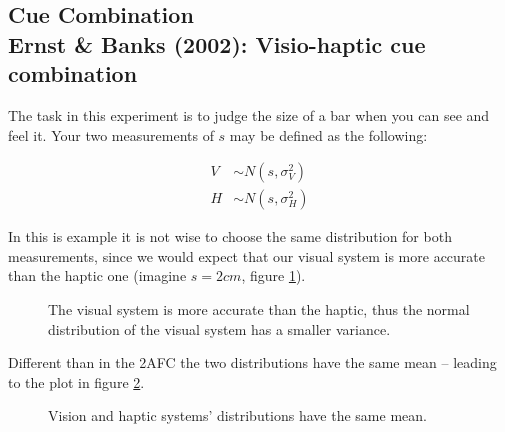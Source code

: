 \documentclass[../main/Notes.tex]{subfiles}
\begin{document}
\subsection[Cue Combination]{Cue Combination\\Ernst \& Banks (2002): Visio-haptic cue combination}
The task in this experiment is to judge the size of a bar when you can see and feel it. Your two measurements of $s$ may be defined as the following:

\begin{align*}
V &\sim N\left(s,\sigma_{V}^{2}\right)\\
H &\sim N\left(s,\sigma_{H}^{2}\right)
\end{align*}

In this is example it is not wise to choose the same distribution for both measurements, since we would expect that our visual system is more accurate than the haptic one (imagine $s=2cm$, figure \ref{fig:2014-06-20_visionhaptics}).
\begin{figure}[ht!]
  \centering
  \caption{The visual system is more accurate than the haptic, thus the normal distribution of the visual system has a smaller variance.}
  \label{fig:2014-06-20_visionhaptics}
\end{figure}

Different than in the 2AFC the two distributions have the same mean -- leading to the plot in figure \ref{fig:2014-06-20_visionhaptics2d}.

\begin{figure}[ht!]
  \centering
  \caption{Vision and haptic systems' distributions have the same mean.}
  \label{fig:2014-06-20_visionhaptics2d}
\end{figure}
\end{document}
